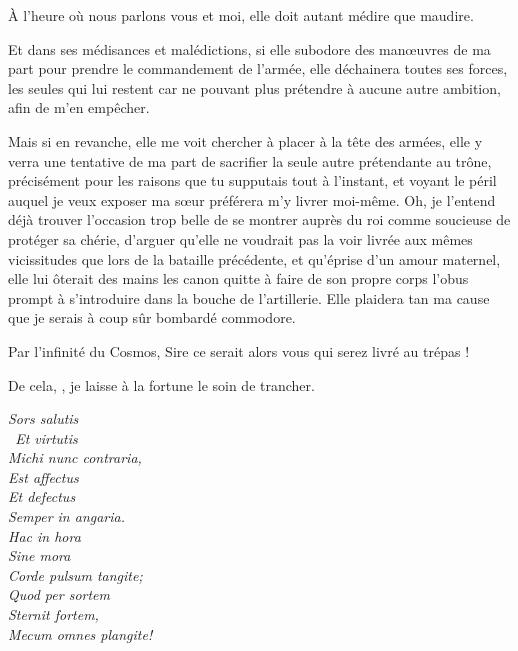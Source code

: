 \begin{drama}
  \alexasspeaks À l’heure où nous parlons vous et moi, elle doit autant médire que maudire.

   \elenaspeaks Et dans ses médisances et malédictions, si elle subodore des manœuvres de ma part pour prendre le commandement de l’armée, elle déchainera toutes ses forces, les seules qui lui restent car ne pouvant plus prétendre à aucune autre ambition, afin de m’en empêcher.

  Mais si en revanche, elle me voit chercher à placer \ela{} à la tête des armées, elle y verra une tentative de ma part de sacrifier la seule autre prétendante au trône, précisément pour les raisons que tu supputais tout à l’instant, et voyant le péril auquel je veux exposer ma sœur préférera m’y livrer moi-même. Oh, je l’entend déjà trouver l’occasion trop belle de se montrer auprès du roi comme soucieuse de protéger sa \princesse{} chérie, d’arguer qu’elle ne voudrait pas la voir livrée aux mêmes vicissitudes que lors de la bataille précédente, et qu’éprise d’un amour maternel, elle lui ôterait des mains les canon quitte à faire de son propre corps l’obus prompt à s’introduire dans la bouche de l’artillerie. Elle plaidera tan ma cause que je serais à coup sûr bombardé commodore.

  \alexasspeaks Par l’infinité du Cosmos, Sire ce serait alors vous qui serez livré au trépas !

  \elenaspeaks  De cela, \alexas, je laisse à la fortune le soin de trancher.

%


  \choirspeaks
  \begin{minipage}[t]{\linewidth}
    \em
    Sors salutis\endnote{\carminaendnote}\\\
    Et virtutis\\
    Michi nunc contraria,\\
    Est affectus\\
    Et defectus\\
    Semper in angaria.\\
    Hac in hora\\
    Sine mora\\
    Corde pulsum tangite;\\
    Quod per sortem\\
    Sternit fortem,\\
    Mecum omnes plangite!
  \end{minipage}



\end{drama}

